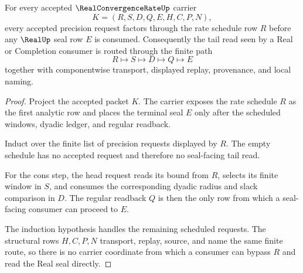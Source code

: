\begin{theorem}
\label{thm:real-convergence-rate-tail-control}
For every accepted $\RealConvergenceRateUp$ carrier
$$
K=(R,S,D,Q,E,H,C,P,N),
$$
every accepted precision request factors through the rate schedule row $R$ before any $\RealUp$ seal row $E$ is consumed. Consequently the tail read seen by a Real or Completion consumer is routed through the finite path
$$
R\longmapsto S\longmapsto D\longmapsto Q\longmapsto E
$$
together with componentwise transport, displayed replay, provenance, and local naming.
\end{theorem}
\begin{proof}
Project the accepted packet $K$. The carrier exposes the rate schedule $R$ as the first analytic row and places the terminal seal $E$ only after the scheduled windows, dyadic ledger, and regular readback.

Induct over the finite list of precision requests displayed by $R$. The empty schedule has no accepted request and therefore no seal-facing tail read.

For the cons step, the head request reads its bound from $R$, selects its finite window in $S$, and consumes the corresponding dyadic radius and slack comparison in $D$. The regular readback $Q$ is then the only row from which a seal-facing consumer can proceed to $E$.

The induction hypothesis handles the remaining scheduled requests. The structural rows $H,C,P,N$ transport, replay, source, and name the same finite route, so there is no carrier coordinate from which a consumer can bypass $R$ and read the Real seal directly.
\end{proof}

